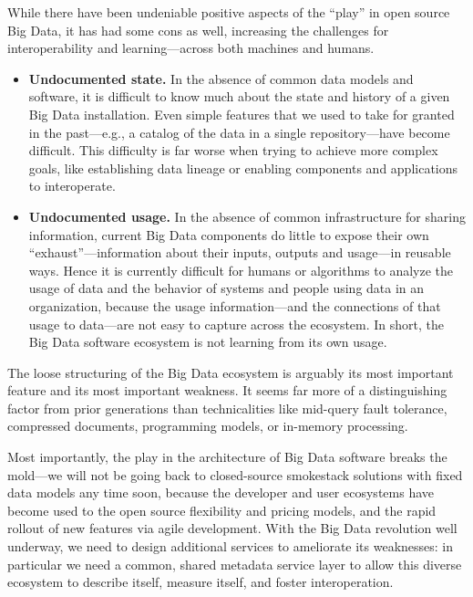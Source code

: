 \documentclass[10pt,letterpaper]{article}
\begin{document}
While there have been undeniable positive aspects of the ``play'' in open source Big Data, it has had some cons as well, increasing the challenges for interoperability and learning---across both machines and humans.
\begin{itemize}
\item \textbf{Undocumented state.}  In the absence of common data models and software, it is difficult to know much about the state and history of a given Big Data installation.  Even simple features that we used to take for granted in the past---e.g., a catalog of the data in a single repository---have become difficult.  This difficulty is far worse when trying to achieve more complex goals, like establishing data lineage or enabling components and applications to interoperate.
\item \textbf{Undocumented usage.} In the absence of common infrastructure for sharing information, current Big Data components do little to expose their own ``exhaust''---information about their inputs, outputs and usage---in reusable ways.  Hence it is currently difficult for humans or algorithms to analyze the usage of data and the behavior of systems and people using data in an organization, because the usage information---and the connections of that usage to data---are not easy to capture across the ecosystem.  In short, the Big Data software ecosystem is not learning from its own usage.
\end{itemize}

The loose structuring of the Big Data ecosystem is arguably its most important feature and its most important weakness.  It seems far more of a distinguishing factor from prior generations than technicalities like mid-query fault tolerance, compressed documents, programming models, or in-memory processing. 

Most importantly, the play in the architecture of Big Data software breaks the mold---we will not be going back to closed-source smokestack solutions with fixed data models any time soon, because the developer and user ecosystems have become used to the open source flexibility and pricing models, and the rapid rollout of new features via agile development.  With the Big Data revolution well underway, we need to design additional services to ameliorate its weaknesses: in particular we need a common, shared metadata service layer to allow this diverse ecosystem to describe itself, measure itself, and foster interoperation.

\end{document}
